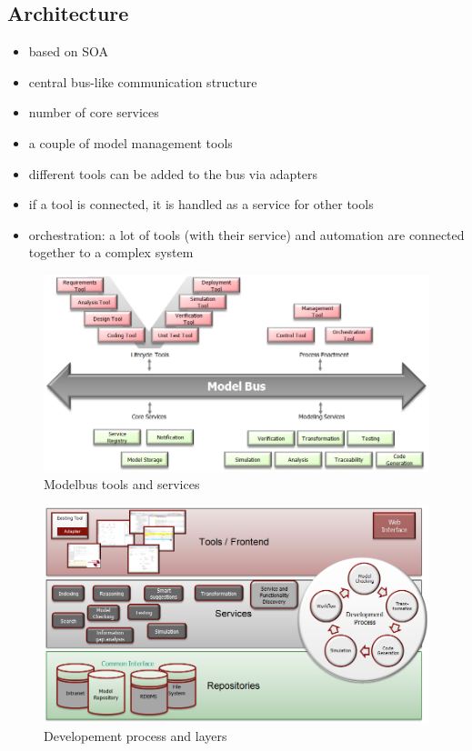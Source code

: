 \subsection{Architecture}
\begin{itemize}
\item based on SOA
\item central bus-like communication structure
\item number of core services
\item a couple of model management tools
\item different tools can be added to the bus via adapters
\item if a tool is connected, it is handled as a service for other tools
\item orchestration: a lot of tools (with their service) and automation are connected together to a complex system
\end{itemize}

\begin{figure}
	\centering
		\includegraphics[width=\textwidth]{modelbus_1}
	\caption{Modelbus tools and services}
	\label{fig:sonarrunning}
\end{figure}

\begin{figure}
	\centering
		\includegraphics[width=\textwidth]{modelbus_2}
	\caption{Developement process and layers}
	\label{fig:sonarrunning}
\end{figure}

